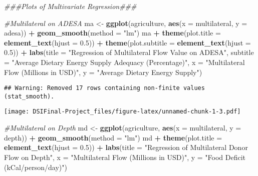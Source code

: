 \documentclass[
]{article}
\newenvironment{Shaded}{\begin{snugshade}}{\end{snugshade}}
\newcommand{\CommentTok}[1]{\textcolor[rgb]{0.56,0.35,0.01}{\textit{#1}}}
\newcommand{\DataTypeTok}[1]{\textcolor[rgb]{0.13,0.29,0.53}{#1}}
\newcommand{\FloatTok}[1]{\textcolor[rgb]{0.00,0.00,0.81}{#1}}
\newcommand{\KeywordTok}[1]{\textcolor[rgb]{0.13,0.29,0.53}{\textbf{#1}}}
\newcommand{\NormalTok}[1]{#1}
\newcommand{\OperatorTok}[1]{\textcolor[rgb]{0.81,0.36,0.00}{\textbf{#1}}}
\newcommand{\StringTok}[1]{\textcolor[rgb]{0.31,0.60,0.02}{#1}}
\begin{document}
\begin{Shaded}
\begin{Highlighting}[]
\CommentTok{###Plots of Multivariate Regression###}

\CommentTok{#Multilateral on ADESA}
\NormalTok{ma <-}\StringTok{ }\KeywordTok{ggplot}\NormalTok{(agriculture, }\KeywordTok{aes}\NormalTok{(}\DataTypeTok{x =}\NormalTok{ multilateral, }\DataTypeTok{y =}\NormalTok{ adesa)) }\OperatorTok{+}\StringTok{ }\KeywordTok{geom_smooth}\NormalTok{(}\DataTypeTok{method =} \StringTok{"lm"}\NormalTok{)}
\NormalTok{ma }\OperatorTok{+}\StringTok{ }\KeywordTok{theme}\NormalTok{(}\DataTypeTok{plot.title =} \KeywordTok{element_text}\NormalTok{(}\DataTypeTok{hjust =} \FloatTok{0.5}\NormalTok{)) }\OperatorTok{+}\StringTok{ }
\StringTok{  }\KeywordTok{theme}\NormalTok{(}\DataTypeTok{plot.subtitle =} \KeywordTok{element_text}\NormalTok{(}\DataTypeTok{hjust =} \FloatTok{0.5}\NormalTok{)) }\OperatorTok{+}\StringTok{ }
\StringTok{  }\KeywordTok{labs}\NormalTok{(}\DataTypeTok{title =} \StringTok{"Regression of Multilateral Flow Value on ADESA"}\NormalTok{, }
       \DataTypeTok{subtitle =} \StringTok{"Average Dietary Energy Supply Adequacy (Percentage)"}\NormalTok{,}
       \DataTypeTok{x =} \StringTok{"Multilateral Flow (Millions in USD)"}\NormalTok{, }\DataTypeTok{y =} \StringTok{"Average Dietary Energy Supply"}\NormalTok{)}
\end{Highlighting}
\end{Shaded}

\begin{verbatim}
## Warning: Removed 17 rows containing non-finite values (stat_smooth).
\end{verbatim}

\texttt{[image: DSIFinal-Project\_files/figure-latex/unnamed-chunk-1-3.pdf]}

\begin{Shaded}
\begin{Highlighting}[]
\CommentTok{#Multilateral on Depth}
\NormalTok{md <-}\StringTok{ }\KeywordTok{ggplot}\NormalTok{(agriculture, }\KeywordTok{aes}\NormalTok{(}\DataTypeTok{x =}\NormalTok{ multilateral, }\DataTypeTok{y =}\NormalTok{ depth)) }\OperatorTok{+}\StringTok{ }\KeywordTok{geom_smooth}\NormalTok{(}\DataTypeTok{method =} \StringTok{"lm"}\NormalTok{)}
\NormalTok{md }\OperatorTok{+}\StringTok{ }\KeywordTok{theme}\NormalTok{(}\DataTypeTok{plot.title =} \KeywordTok{element_text}\NormalTok{(}\DataTypeTok{hjust =} \FloatTok{0.5}\NormalTok{)) }\OperatorTok{+}\StringTok{ }
\StringTok{  }\KeywordTok{labs}\NormalTok{(}\DataTypeTok{title =} \StringTok{"Regression of Multilateral Donor Flow on Depth"}\NormalTok{, }
       \DataTypeTok{x =} \StringTok{"Multilateral Flow (Millions in USD)"}\NormalTok{, }\DataTypeTok{y =} \StringTok{"Food Deficit (kCal/person/day)"}\NormalTok{)}
\end{Highlighting}
\end{Shaded}
\end{document}
